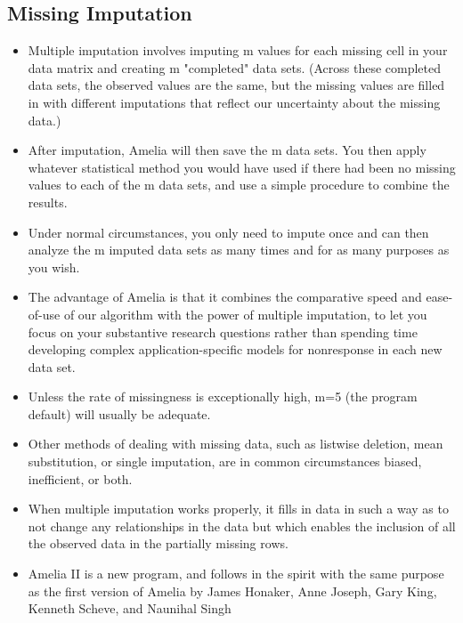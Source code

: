 \subsection{Missing Imputation}
\begin{itemize}
\item Multiple imputation involves imputing m values for each missing cell in your data matrix and creating m "completed" data sets. (Across these completed data sets, the observed values are the same, but the missing values are filled in with different imputations that reflect our uncertainty about the missing data.) 
\item After imputation, Amelia will then save the m data sets. You then apply whatever statistical method you would have used if there had been no missing values to each of the m data sets, and use a simple procedure to combine the results. 
\item Under normal circumstances, you only need to impute once and can then analyze the m imputed data sets as many times and for as many purposes as you wish. 
\item The advantage of Amelia is that it combines the comparative speed and ease-of-use of our algorithm with the power of multiple imputation, to let you focus on your substantive research questions rather than spending time developing complex application-specific models for nonresponse in each new data set. 
\item Unless the rate of missingness is exceptionally high, m=5 (the program default) will usually be adequate. 
\item Other methods of dealing with missing data, such as listwise deletion, mean substitution, or single imputation, are in common circumstances biased, inefficient, or both. 
\item When multiple imputation works properly, it fills in data in such a way as to not change any relationships in the data but which enables the inclusion of all the observed data in the partially missing rows.

\item Amelia II is a new program, and follows in the spirit with the same purpose as the first version of Amelia by James Honaker, Anne Joseph, Gary King, Kenneth Scheve, and Naunihal Singh
\end{itemize}

